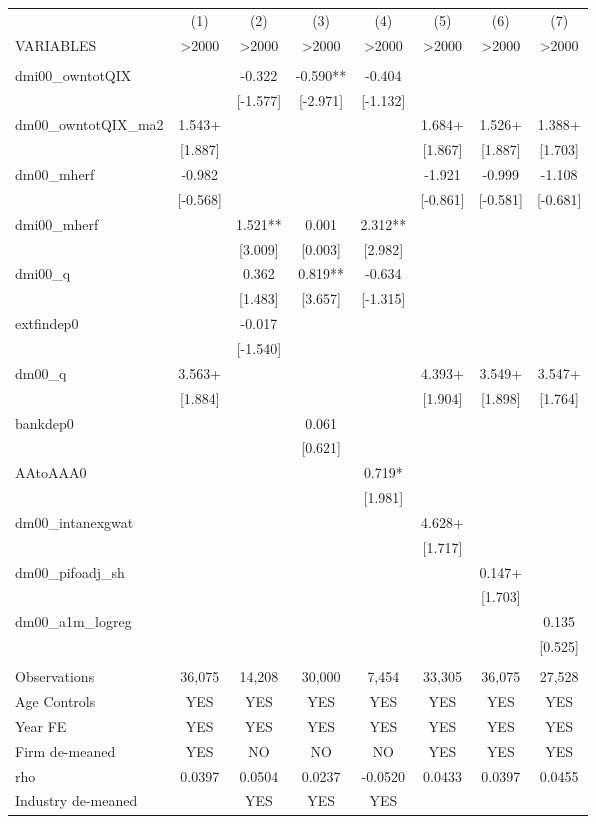 \documentclass[]{article}
\begin{document}
\begin{tabular}{lccccccc} \hline
 & (1) & (2) & (3) & (4) & (5) & (6) & (7) \\
VARIABLES & >2000 & >2000 & >2000 & >2000 & >2000 & >2000 & >2000 \\ \hline
 &  &  &  &  &  &  &  \\
dmi00\_owntotQIX &  & -0.322 & -0.590** & -0.404 &  &  &  \\
 &  & [-1.577] & [-2.971] & [-1.132] &  &  &  \\
dm00\_owntotQIX\_ma2 & 1.543+ &  &  &  & 1.684+ & 1.526+ & 1.388+ \\
 & [1.887] &  &  &  & [1.867] & [1.887] & [1.703] \\
dm00\_mherf & -0.982 &  &  &  & -1.921 & -0.999 & -1.108 \\
 & [-0.568] &  &  &  & [-0.861] & [-0.581] & [-0.681] \\
dmi00\_mherf &  & 1.521** & 0.001 & 2.312** &  &  &  \\
 &  & [3.009] & [0.003] & [2.982] &  &  &  \\
dmi00\_q &  & 0.362 & 0.819** & -0.634 &  &  &  \\
 &  & [1.483] & [3.657] & [-1.315] &  &  &  \\
extfindep0 &  & -0.017 &  &  &  &  &  \\
 &  & [-1.540] &  &  &  &  &  \\
dm00\_q & 3.563+ &  &  &  & 4.393+ & 3.549+ & 3.547+ \\
 & [1.884] &  &  &  & [1.904] & [1.898] & [1.764] \\
bankdep0 &  &  & 0.061 &  &  &  &  \\
 &  &  & [0.621] &  &  &  &  \\
AAtoAAA0 &  &  &  & 0.719* &  &  &  \\
 &  &  &  & [1.981] &  &  &  \\
dm00\_intanexgwat &  &  &  &  & 4.628+ &  &  \\
 &  &  &  &  & [1.717] &  &  \\
dm00\_pifoadj\_sh &  &  &  &  &  & 0.147+ &  \\
 &  &  &  &  &  & [1.703] &  \\
dm00\_a1m\_logreg &  &  &  &  &  &  & 0.135 \\
 &  &  &  &  &  &  & [0.525] \\
 &  &  &  &  &  &  &  \\
Observations & 36,075 & 14,208 & 30,000 & 7,454 & 33,305 & 36,075 & 27,528 \\
Age Controls & YES & YES & YES & YES & YES & YES & YES \\
Year FE & YES & YES & YES & YES & YES & YES & YES \\
Firm de-meaned & YES & NO & NO & NO & YES & YES & YES \\
rho & 0.0397 & 0.0504 & 0.0237 & -0.0520 & 0.0433 & 0.0397 & 0.0455 \\
 Industry de-meaned &  & YES & YES & YES &  &  &  \\ \hline
\end{tabular}
\end{document}
